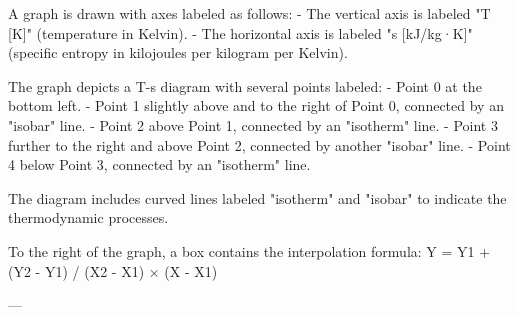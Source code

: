 A graph is drawn with axes labeled as follows:  
- The vertical axis is labeled "T [K]" (temperature in Kelvin).  
- The horizontal axis is labeled "s [kJ/kg·K]" (specific entropy in kilojoules per kilogram per Kelvin).  

The graph depicts a T-s diagram with several points labeled:  
- Point 0 at the bottom left.  
- Point 1 slightly above and to the right of Point 0, connected by an "isobar" line.  
- Point 2 above Point 1, connected by an "isotherm" line.  
- Point 3 further to the right and above Point 2, connected by another "isobar" line.  
- Point 4 below Point 3, connected by an "isotherm" line.  

The diagram includes curved lines labeled "isotherm" and "isobar" to indicate the thermodynamic processes.  

To the right of the graph, a box contains the interpolation formula:  
Y = Y1 + (Y2 - Y1) / (X2 - X1) × (X - X1)  

---